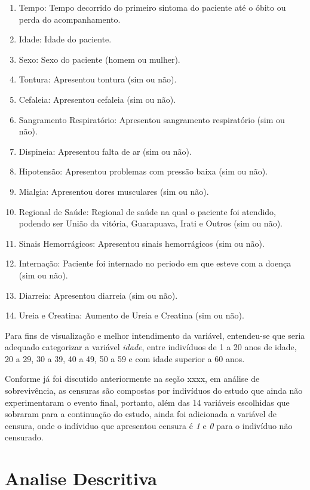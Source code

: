 \documentclass[
	12pt,				%
	openright,			%
	oneside,			%
	a4paper,			%
	brazil				%
	]{abntex2}
\begin{document}
\begin{enumerate}
\def\labelenumi{\arabic{enumi}.}
\tightlist
\item
  Tempo: Tempo decorrido do primeiro sintoma do paciente até o óbito ou perda do acompanhamento.
\item
  Idade: Idade do paciente.
\item
  Sexo: Sexo do paciente (homem ou mulher).
\item
  Tontura: Apresentou tontura (sim ou não).
\item
  Cefaleia: Apresentou cefaleia (sim ou não).
\item
  Sangramento Respiratório: Apresentou sangramento respiratório (sim ou não).
\item
  Dispineia: Apresentou falta de ar (sim ou não).
\item
  Hipotensão: Apresentou problemas com pressão baixa (sim ou não).
\item
  Mialgia: Apresentou dores musculares (sim ou não).
\item
  Regional de Saúde: Regional de saúde na qual o paciente foi atendido, podendo ser União da vitória, Guarapuava, Irati e Outros (sim ou não).
\item
  Sinais Hemorrágicos: Apresentou sinais hemorrágicos (sim ou não).
\item
  Internação: Paciente foi internado no periodo em que esteve com a doença (sim ou não).
\item
  Diarreia: Apresentou diarreia (sim ou não).
\item
  Ureia e Creatina: Aumento de Ureia e Creatina (sim ou não).
\end{enumerate}

Para fins de visualização e melhor intendimento da variável, entendeu-se que seria adequado categorizar a variável \emph{idade}, entre indivíduos de 1 a 20 anos de idade, 20 a 29, 30 a 39, 40 a 49, 50 a 59 e com idade superior a 60 anos.

Conforme já foi discutido anteriormente na seção xxxx, em análise de sobrevivência, as censuras são compostas por indivíduos do estudo que ainda não experimentaram o evento final, portanto, além das 14 variáveis escolhidas que sobraram para a continuação do estudo, ainda foi adicionada a variável de censura, onde o indíviduo que apresentou censura é \emph{1} e \emph{0} para o indivíduo não censurado.

\hypertarget{analise-descritiva}{%
\section{Analise Descritiva}\label{analise-descritiva}}
\end{document}
